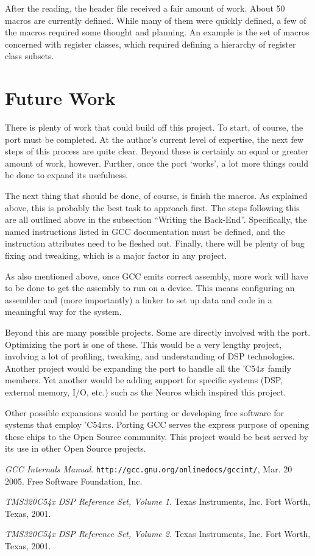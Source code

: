 \documentclass{article}
\newcommand{\chip}{'C54\emph{x}}
\begin{document}
After the reading, the header file received a fair amount of work. About 50
macros are currently defined. While many of them were quickly defined, a few
of the macros required some thought and planning. An example is the set of
macros concerned with register classes, which required defining a hierarchy of
register class subsets. 

\section{Future Work}
There is plenty of work that could build off this project. To start, of course,
the port must be completed. At the author's current level of expertise, the next
few steps of this process are quite clear. Beyond these is certainly an equal or
greater amount of work, however. Further, once the port `works', a lot more
things could be done to expand its usefulness.

The next thing that should be done, of course, is finish the macros. As
explained above, this is probably the best task to approach first. The steps
following this are all outlined above in the subsection ``Writing the Back-End''.
Specifically, the named instructions listed in GCC documentation must be
defined, and the instruction attributes need to be fleshed out. Finally, there
will be plenty of bug fixing and tweaking, which is a major factor in any
project. 

As also mentioned above, once GCC emits correct assembly, more work will have to
be done to get the assembly to run on a device. This means configuring an
assembler and (more importantly) a linker to set up data and code in a
meaningful way for the system.

Beyond this are many possible projects. Some are directly involved with the
port. Optimizing the port is one of these. This would be a very lengthy project,
involving a lot of profiling, tweaking, and understanding of DSP technologies.
Another project would be expanding the port to handle all the \chip\ 
family members. Yet another would be adding support for specific systems (DSP,
external memory, I/O, etc.) such as the Neuros which inspired this project.

Other possible expansions would be porting or developing free software for
systems that employ \chip:s. Porting GCC serves the express purpose
of opening these chips to the Open Source community. This project would be best
served by its use in other Open Source projects. 

\begin{thebibliography}{99}
 \emph{GCC Internals Manual}.
\texttt{http://gcc.gnu.org/onlinedocs/gccint/}, Mar. 20 2005. Free Software
Foundation, Inc.

 \emph{TMS320C54x DSP Reference Set, Volume 1}. Texas
Instruments, Inc. Fort Worth, Texas, 2001.

 \emph{TMS320C54x DSP Reference Set, Volume 2}. Texas
Instruments, Inc. Fort Worth, Texas, 2001.

\end{thebibliography}
\end{document}
